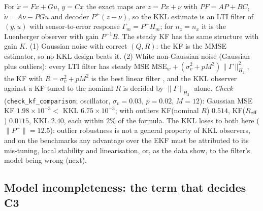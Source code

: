 \begin{remark}\label{rem:m3-kf}
For $\dot x=Fx+Gu$, $y=Cx$ the exact maps are $z=Px+\nu$ with $PF=AP+BC$, $\dot\nu=A\nu-PGu$ and
decoder $P^{+}(z-\nu)$, so the KKL estimate is an LTI filter of $(y,u)$ with sensor-to-error response
$\Gamma_m=P^{+}H_m$; for $n_z=n_x$ it is the Luenberger observer with gain $P^{-1}B$. The steady KF
has the same structure with gain $K$. (1) Gaussian noise with correct $(Q,R)$: the KF is the MMSE
estimator, so no KKL design beats it. (2) White non-Gaussian noise (Gaussian plus outliers): every
LTI filter has steady MSE $\mathrm{MSE}_w+(\sigma_v^2+pM^2)\|\Gamma\|^2_{H_2}$, the KF with
$R=\sigma_v^2+pM^2$ is the best linear filter \citep{andersonmoore1979}, and the KKL observer against a
KF tuned to the nominal $R$ is decided by $\|\Gamma\|_{H_2}$ alone. \emph{Check}
(\texttt{check\_kf\_comparison}; oscillator, $\sigma_v=0.03$, $p=0.02$, $M=12$): Gaussian MSE KF
$1.98\times10^{-3}<$ KKL $6.75\times10^{-3}$; with outliers KF(nominal $R$) $0.514$, KF($R_{\rm eff}$)
$0.0115$, KKL $2.40$, each within $2\%$ of the formula. The KKL loses to both here ($\|P^{+}\|=12.5$):
outlier robustness is not a general property of KKL observers, and on the benchmarks any advantage
over the EKF must be attributed to its mis-tuning, local stability and linearisation, or, as the data show,
to the filter's model being wrong (next).
\end{remark}

\subsection{Model incompleteness: the term that decides C3}

